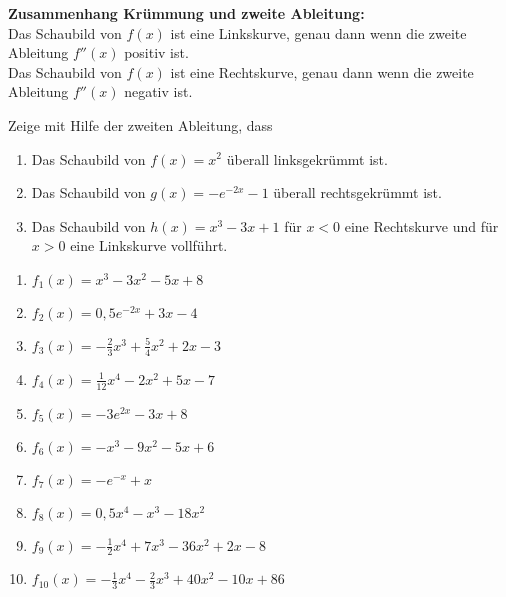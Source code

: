 \begin{tcolorbox}
	\textbf{Zusammenhang Krümmung und zweite Ableitung:}\\
	\textcolor{loestc}{Das Schaubild von \(f(x)\) ist eine Linkskurve, genau dann wenn die zweite Ableitung \(f''(x)\) positiv ist.\\
		Das Schaubild von \(f(x)\) ist eine Rechtskurve, genau dann wenn die zweite Ableitung \(f''(x)\) negativ ist.\\}
\end{tcolorbox}
Zeige mit Hilfe der zweiten Ableitung, dass
\begin{enumerate}
	\item Das Schaubild von \(f(x)=x^2\) überall linksgekrümmt ist.
	\item Das Schaubild von \(g(x)=-e^{-2x}-1\) überall rechtsgekrümmt ist.
	\item Das Schaubild von \(h(x)=x^3-3x+1\) für \(x<0\) eine Rechtskurve und für \(x>0\) eine Linkskurve vollführt.
\end{enumerate}
\newpage
\begin{Exercise}[title={\raggedright Gib mit Hilfe der zweiten Ableitung die Intervalle an, in denen das Schaubild eine Links- bzw. Rechtskurve hat.}, label=kruemmungA1]
	\begin{enumerate}[label=\alph*)]
		\item \(f_1(x)=x^3-3x^2-5x+8\)
		\item \(f_2(x)=0,5e^{-2x}+3x-4\)
		\item \(f_3(x)=-\frac{2}{3}x^3+\frac{5}{4}x^2+2x-3\)
		\item \(f_4(x)=\frac{1}{12}x^4-2x^2+5x-7\)
		\item \(f_5(x)=-3e^{2x}-3x+8\)
		\item \(f_6(x)=-x^3-9x^2-5x+6\)
		\item \(f_7(x)=-e^{-x}+x\)
		\item \(f_8(x)=0,5x^4-x^3-18x^2\)
		\item \(f_9(x)=-\frac{1}{2}x^4+7x^3-36x^2+2x-8\)
		\item \(f_{10}(x)=-\frac{1}{3}x^4-\frac{2}{3}x^3+40x^2-10x+86\)
	\end{enumerate}
\end{Exercise}

